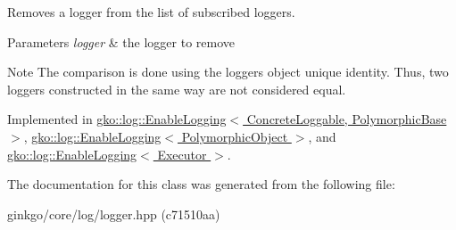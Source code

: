 Removes a logger from the list of subscribed loggers. 


\begin{DoxyParams}{Parameters}
{\em logger} & the logger to remove\\
\hline
\end{DoxyParams}
\begin{DoxyNote}{Note}
The comparison is done using the logger\textquotesingle{}s object unique identity. Thus, two loggers constructed in the same way are not considered equal. 
\end{DoxyNote}


Implemented in \hyperlink{classgko_1_1log_1_1EnableLogging_aba5317f8a03956a61d770e9b07fc65cc}{gko\+::log\+::\+Enable\+Logging$<$ Concrete\+Loggable, Polymorphic\+Base $>$}, \hyperlink{classgko_1_1log_1_1EnableLogging_aba5317f8a03956a61d770e9b07fc65cc}{gko\+::log\+::\+Enable\+Logging$<$ Polymorphic\+Object $>$}, and \hyperlink{classgko_1_1log_1_1EnableLogging_aba5317f8a03956a61d770e9b07fc65cc}{gko\+::log\+::\+Enable\+Logging$<$ Executor $>$}.



The documentation for this class was generated from the following file\+:\begin{DoxyCompactItemize}
\item 
ginkgo/core/log/logger.\+hpp (c71510aa)\end{DoxyCompactItemize}

